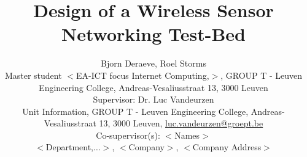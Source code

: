 \documentclass[a4paper]{article}
\begin{document}
\title{Design of a Wireless Sensor Networking Test-Bed}

\author{Bjorn Deraeve\supit{*}, Roel Storms\supit{*} \\ \vspace*{0.25cm}
            \small{\supit{*}Master student $<$EA-ICT focus Internet Computing,$>$, GROUP T - Leuven Engineering College, Andreas-Vesaliusstraat 13, 3000 Leuven \\ \vspace*{1.5cm}
            Supervisor: Dr. Luc Vandeurzen \\            
            Unit Information, GROUP T - Leuven Engineering College, Andreas-Vesaliusstraat 13, 3000 Leuven, \href{mailto:luc.vandeurzen@groept.be}{luc.vandeurzen@groept.be}} \\ \vspace*{1em}
            Co-supervisor(s): $<$Names$>$\\
            $<$Department,$\ldots>$, $<$Company$>$, $<$Company Address$>$\\
            }
  

\pagebreak  




\end{document}
